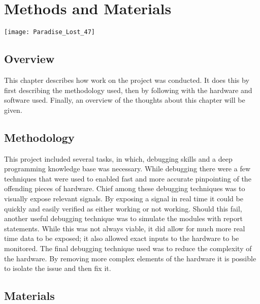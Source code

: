 
\chapter{Methods and Materials} %

\texttt{[image: Paradise\_Lost\_47]}

\label{Chapter 3} %

\section{Overview}

This chapter describes how work on the project was conducted. It does this by first describing the methodology used, then by following with the hardware and software used. Finally, an overview of the thoughts about this chapter will be given.


\section{Methodology}

\label{Ch3 Sec1}

This project included several tasks, in which, debugging skills and a deep programming knowledge base was necessary. While debugging there were a few techniques that were used to enabled fast and more accurate pinpointing of the offending pieces of hardware. Chief among these debugging techniques was to visually expose relevant signals. By exposing a signal in real time it could be quickly and easily verified as either working or not working. Should this fail, another useful debugging technique was to simulate the modules with report statements. While this was not always viable, it did allow for much more real time data to be exposed; it also allowed exact inputs to the hardware to be monitored. The final debugging technique used was to reduce the complexity of the hardware. By removing more complex elements of the hardware it is possible to isolate the issue and then fix it.

\section{Materials}

